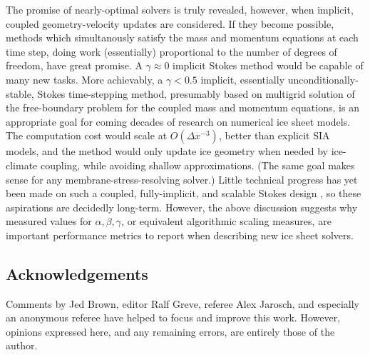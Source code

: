 \documentclass[review]{igs}
\begin{document}
The promise of nearly-optimal solvers is truly revealed, however, when implicit, coupled geometry-velocity updates are considered.  If they become possible, methods which simultanously satisfy the mass and momentum equations at each time step, doing work (essentially) proportional to the number of degrees of freedom, have great promise.  A $\gamma \approx 0$ implicit Stokes method would be capable of many new tasks.  More achievably, a $\gamma < 0.5$ implicit, essentially unconditionally-stable, Stokes time-stepping method, presumably based on multigrid solution of the free-boundary problem for the coupled mass and momentum equations, is an appropriate goal for coming decades of research on numerical ice sheet models.  The computation cost would scale at $O(\Delta x^{-3})$, better than explicit SIA models, and the method would only update ice geometry when needed by ice-climate coupling, while avoiding shallow approximations.  (The same goal makes sense for any membrane-stress-resolving solver.)  Little technical progress has yet been made on such a coupled, fully-implicit, and scalable Stokes design \cite[but see][]{WirbelJarosch2020}, so these aspirations are decidedly long-term.  However, the above discussion suggests why measured values for $\alpha,\beta,\gamma$, or equivalent algorithmic scaling measures, are important performance metrics to report when describing new ice sheet solvers.

\subsection{Acknowledgements}  Comments by Jed Brown, editor Ralf Greve, referee Alex Jarosch, and especially an anonymous referee have helped to focus and improve this work.  However, opinions expressed here, and any remaining errors, are entirely those of the author.

%
%
\end{document}
